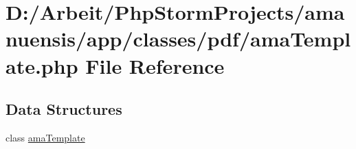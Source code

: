 \hypertarget{ama_template_8php}{}\section{D\+:/\+Arbeit/\+Php\+Storm\+Projects/amanuensis/app/classes/pdf/ama\+Template.php File Reference}
\label{ama_template_8php}
\subsection*{Data Structures}
\begin{DoxyCompactItemize}
\item 
class \hyperlink{classama_template}{ama\+Template}
\end{DoxyCompactItemize}
